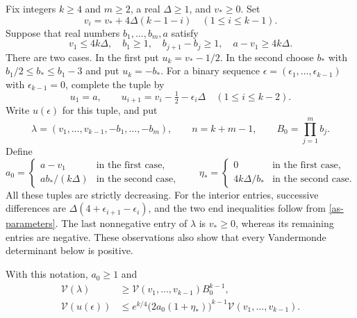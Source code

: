Fix integers $k\geq4$ and $m\geq2$, a real $\Delta\geq1$,
and $v_*\geq0$.  Set
\[
 v_i=v_*+4\Delta(k-1-i)\quad(1\leq i\leq k-1).
\]
Suppose that real numbers $b_1,\ldots,b_m,a$ satisfy
\begin{equation}\label{as-parameters}
 v_1\leq4k\Delta,\quad b_1\geq1,\quad
 b_{j+1}-b_j\geq1,\quad a-v_1\geq4k\Delta.
\end{equation}
There are two cases.  In the first put $u_k=v_*-1/2$.
In the second choose $b_*$ with
$b_1/2\leq b_*\leq b_1-3$ and put $u_k=-b_*$.
For a binary sequence $\epsilon=(\epsilon_1,\ldots,\epsilon_{k-1})$
with $\epsilon_{k-1}=0$, complete the tuple by
\[
 u_1=a,\qquad
 u_{i+1}=v_i-\tfrac12-\epsilon_i\Delta
                      \quad(1\leq i\leq k-2).
\]
Write $u(\epsilon)$ for this tuple, and put
\[
 \lambda=(v_1,\ldots,v_{k-1},-b_1,\ldots,-b_m),
 \qquad n=k+m-1,\qquad B_0=\prod_{j=1}^m b_j.
\]
Define
\begin{equation}\label{as-effective-a}
 a_0=
 \begin{cases}a-v_1&\text{in the first case},\\
 a b_* /(k\Delta)&\text{in the second case},\end{cases}
 \qquad
 \eta_*=
 \begin{cases}0&\text{in the first case},\\
 4k\Delta/b_*&\text{in the second case}.
 \end{cases}
\end{equation}
All these tuples are strictly decreasing.  For the interior entries,
successive differences are $\Delta(4+\epsilon_{i+1}-\epsilon_i)$,
and the two end inequalities follow from \eqref{as-parameters}.
The last nonnegative entry of $\lambda$ is $v_*\geq0$, whereas
its remaining entries are negative.  These observations also show
that every Vandermonde determinant below is positive.

\begin{lemma}\label{as-vand-comparison}
With this notation, $a_0\geq1$ and
\begin{align}
 \mathcal V(\lambda)&\geq
       \mathcal V(v_1,\ldots,v_{k-1})B_0^{k-1},
                    \label{as-vand-lambda}\\
 \mathcal V(u(\epsilon))&\leq
       e^{k/4}\bigl(2a_0(1+\eta_*)\bigr)^{k-1}
                    \mathcal V(v_1,\ldots,v_{k-1}).
                    \label{as-vand-u}
\end{align}
\end{lemma}

